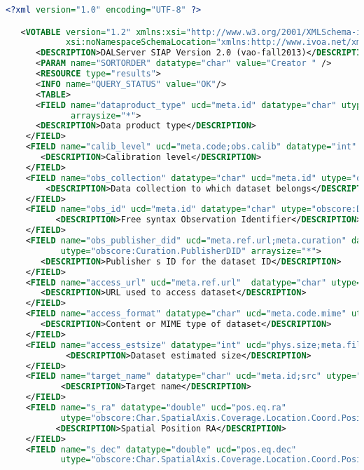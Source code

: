 \documentclass[11pt,a4paper]{ivoa}
\begin{document}
\begin{lstlisting}[basicstyle=\scriptsize,language=XML]
<?xml version="1.0" encoding="UTF-8" ?>

   <VOTABLE version="1.2" xmlns:xsi="http://www.w3.org/2001/XMLSchema-instance"
            xsi:noNamespaceSchemaLocation="xmlns:http://www.ivoa.net/xml/VOTable-1.2.xsd" >
      <DESCRIPTION>DALServer SIAP Version 2.0 (vao-fall2013)</DESCRIPTION>
      <PARAM name="SORTORDER" datatype="char" value="Creator " />
      <RESOURCE type="results">
      <INFO name="QUERY_STATUS" value="OK"/>
      <TABLE>
      <FIELD name="dataproduct_type" ucd="meta.id" datatype="char" utype="obscore:ObsDataSet.dataProductType"
             arraysize="*">
      <DESCRIPTION>Data product type</DESCRIPTION>
    </FIELD>
    <FIELD name="calib_level" ucd="meta.code;obs.calib" datatype="int" utype="obscore:ObsDataSet.calibLevel">
       <DESCRIPTION>Calibration level</DESCRIPTION>
    </FIELD>
    <FIELD name="obs_collection" datatype="char" ucd="meta.id" utype="obscore:DataID.Collection" arraysize="*">
        <DESCRIPTION>Data collection to which dataset belongs</DESCRIPTION>
    </FIELD>
    <FIELD name="obs_id" ucd="meta.id" datatype="char" utype="obscore:DataID.observationID" arraysize="*">
          <DESCRIPTION>Free syntax Observation Identifier</DESCRIPTION>
    </FIELD>
    <FIELD name="obs_publisher_did" ucd="meta.ref.url;meta.curation" datatype="char"
           utype="obscore:Curation.PublisherDID" arraysize="*">
       <DESCRIPTION>Publisher s ID for the dataset ID</DESCRIPTION>
    </FIELD>
    <FIELD name="access_url" ucd="meta.ref.url"  datatype="char" utype="obscore:Access.Reference" arraysize="*">
       <DESCRIPTION>URL used to access dataset</DESCRIPTION>
    </FIELD>
    <FIELD name="access_format" datatype="char" ucd="meta.code.mime" utype="obscore:Access.Format" arraysize="*">
       <DESCRIPTION>Content or MIME type of dataset</DESCRIPTION>
    </FIELD>
    <FIELD name="access_estsize" datatype="int" ucd="phys.size;meta.file" utype="obscore:Access.Size">
            <DESCRIPTION>Dataset estimated size</DESCRIPTION>
    </FIELD>
    <FIELD name="target_name" datatype="char" ucd="meta.id;src" utype="obscore:Target.Name" arraysize="*">
           <DESCRIPTION>Target name</DESCRIPTION>
    </FIELD>
    <FIELD name="s_ra" datatype="double" ucd="pos.eq.ra"
           utype="obscore:Char.SpatialAxis.Coverage.Location.Coord.Position2D.Value2.C1" unit="deg" >
          <DESCRIPTION>Spatial Position RA</DESCRIPTION>
    </FIELD>
    <FIELD name="s_dec" datatype="double" ucd="pos.eq.dec"
           utype="obscore:Char.SpatialAxis.Coverage.Location.Coord.Position2D.Value2.C2" unit="deg" >

\end{lstlisting}
\end{document}
